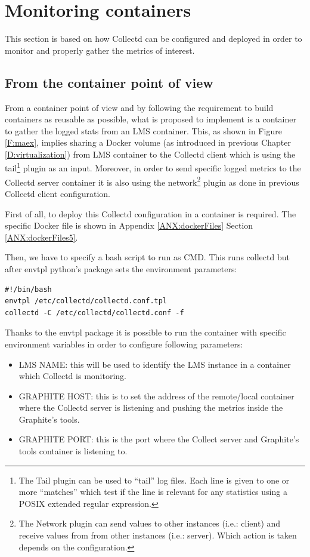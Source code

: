 \section{Monitoring containers}

This section is based on how Collectd can be configured and deployed in order to monitor and properly gather the metrics of interest.

\subsection{From the container point of view}

From a container point of view and by following the requirement to build containers as reusable as possible, what is proposed to implement is a container to gather the logged stats from an LMS container. This, as shown in Figure \ref{F:maex}, implies sharing a Docker volume (as introduced in previous Chapter \ref{D:virtualization}) from LMS container to the Collectd client which is using the tail\footnote{The Tail plugin can be used to “tail” log files. Each line is given to one or more “matches” which test if the line is relevant for any statistics using a POSIX extended regular expression.} plugin as an input. Moreover, in order to send specific logged metrics to the Collectd server container it is also using the network\footnote{The Network plugin can send values to other instances (i.e.: client) and receive values from from other instances (i.e.: server). Which action is taken depends on the configuration.} plugin as done in previous Collectd client configuration.

First of all, to deploy this Collectd configuration in a container is required. The specific Docker file is shown in Appendix \ref{ANX:dockerFiles} Section \ref{ANX:dockerFiles5}.

Then, we have to specify a bash script to run as CMD. This runs collectd but after envtpl python's package sets the environment parameters:
\begin{verbatim}
#!/bin/bash
envtpl /etc/collectd/collectd.conf.tpl
collectd -C /etc/collectd/collectd.conf -f
\end{verbatim}

Thanks to the envtpl package it is possible to run the container with specific environment variables in order to configure following parameters:

\begin{itemize}
\item LMS NAME: this will be used to identify the LMS instance in a container which Collectd is monitoring.
\item GRAPHITE HOST: this is to set the address of the remote/local container where the Collectd server is listening and pushing the metrics inside the Graphite's tools.
\item GRAPHITE PORT: this is the port where the Collect server and Graphite's tools container is listening to.
\end{itemize}

